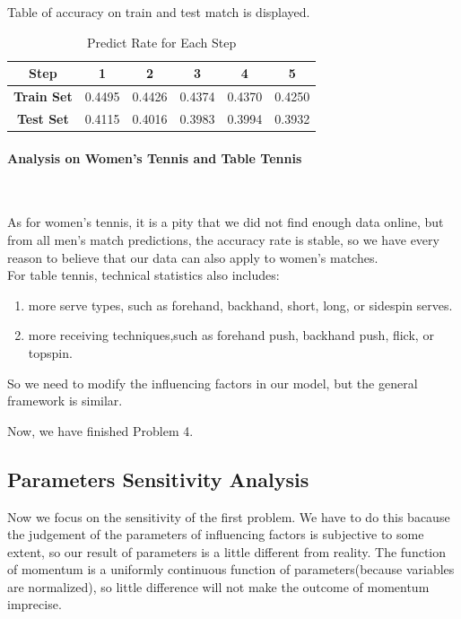 Table of accuracy on train and test match is displayed.

\begin{table}[H]
    \centering
    \begin{tabular}{cccccc}
        \toprule
        \textbf{Step} & \textbf{1} & \textbf{2} & \textbf{3} & \textbf{4} & \textbf{5} \\
        \midrule
        \textbf{Train Set} & 0.4495 & 0.4426 & 0.4374 & 0.4370 & 0.4250 \\
        \textbf{Test Set} & 0.4115 & 0.4016 & 0.3983 & 0.3994 & 0.3932 \\
        \bottomrule
    \end{tabular}
    \caption{Predict Rate for Each Step}
    \label{tab:predict_rate}
\end{table}

\paragraph{Analysis on Women's Tennis and Table Tennis}~{}

As for women's tennis, it is a pity that we did not find enough data online, but from all men's match predictions, the 
accuracy rate is stable, so we have every reason to believe that our data can also apply to women's matches. \\
For table tennis, technical statistics also includes: 
\begin{enumerate}
    \item more serve types, such as forehand, backhand, short, long, or sidespin serves.
    \item more receiving techniques,such as forehand push, backhand push, flick, or topspin.
\end{enumerate}
So we need to modify the influencing factors in our model, but the general framework is similar.

Now, we have finished Problem 4.

\subsection{Parameters Sensitivity Analysis}

Now we focus on the sensitivity of the first problem. We have to do this bacause the judgement of the parameters of 
influencing factors is subjective to some extent, so our result of parameters is a little different from reality. 
The function of momentum is a uniformly continuous function of parameters(because variables are normalized), so little
difference will not make the outcome of momentum imprecise.